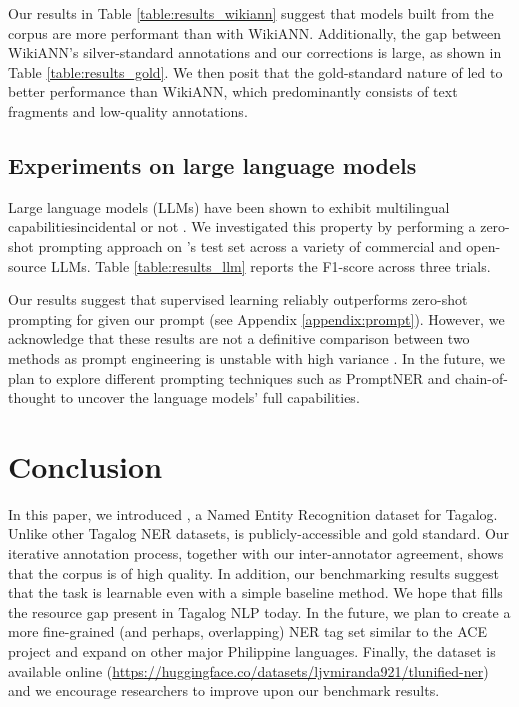 \documentclass[11pt]{article}
\begin{document}


Our results in Table \ref{table:results_wikiann} suggest that models built from the \tlunified{} corpus are more performant than with WikiANN.
Additionally, the gap between WikiANN's silver-standard annotations and our corrections is large, as shown in Table \ref{table:results_gold}.
We then posit that the gold-standard nature of \tlunified{} led to better performance than WikiANN, which predominantly consists of text fragments and low-quality annotations.

\subsection{Experiments on large language models}

Large language models (LLMs) have been shown to exhibit multilingual capabilities\textemdash incidental or not \citep{Briakou2023SearchingFN}.
We investigated this property by performing a zero-shot prompting approach on \tlunified{}'s test set across a variety of commercial and open-source LLMs.
Table \ref{table:results_llm} reports the F1-score across three trials.



Our results suggest that supervised learning reliably outperforms zero-shot prompting for \tlunified{} given our prompt (see Appendix \ref{appendix:prompt}).
However, we acknowledge that these results are not a definitive comparison between two methods as prompt engineering is unstable with high variance \citep{Webson2022DoPB,Zhao2021CalibrateBU}.
In the future, we plan to explore different prompting techniques such as PromptNER \citep{Ashok2023PromptNER} and chain-of-thought \citep{Wei2023CoT} to uncover the language models' full capabilities.

\section{Conclusion}

In this paper, we introduced \tlunified{}, a Named Entity Recognition dataset for Tagalog.
Unlike other Tagalog NER datasets, \tlunified{} is publicly-accessible and gold standard.
Our iterative annotation process, together with our inter-annotator agreement, shows that the corpus is of high quality.
In addition, our benchmarking results suggest that the task is learnable even with a simple baseline method.
We hope that \tlunified{} fills the resource gap present in Tagalog NLP today.
In the future, we plan to create a more fine-grained (and perhaps, overlapping) NER tag set similar to the ACE project and expand on other major Philippine languages.
Finally, the dataset is available online (\url{https://huggingface.co/datasets/ljvmiranda921/tlunified-ner}) and we encourage researchers to improve upon our benchmark results.
\end{document}
